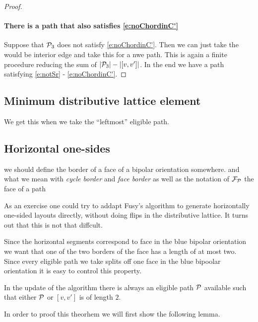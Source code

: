 \begin{proof}

\paragraph{There is a path that also satisfies \ref{e:noChordinC'}}
Suppose that $\P_3$ does not satisfy \ref{e:noChordinC'}. Then we can just take the would be interior edge and take this for a nwe path. This is again a finite procedure reducing the sum of $|\P_3| -|[v,v']|$. In the end we have a path satisfying \ref{e:notSr} - \ref{e:noChordinC'}.



\end{proof}

\subsection{Minimum distributive lattice element}
\label{ss:minimal}
We get this when we take the    ``leftmost'' eligible path. 

\renewcommand{\F}{\scr F}
\subsection{Horizontal one-sides}
\label{ss:blue}
\note we should define the border of a face of a bipolar orientation somewhere. 
\note and what we mean with \emph{cycle border} and \emph{face border}
\note as well as the notation of $\F_\P$ the face of a path

As an exercise one could try to addapt Fusy's algorithm to generate horizontally one-sided layouts directly, without doing flips in the distributive lattice. It turns out that this is not that diffcult.

Since the horizontal segments correspond to face in the blue bipolar orientation we want that one of the two borders of the face has a length of at most two. Since every eligible path we take splits off one face in the blue bipoolar orientation it is easy to control this property.

\begin{thrm}
\label{th:blueelig}
In the update of the algorithm there is always an eligible path $\P$ available such that either $\P$ or $[v,v']$ is of length $2$. 
\end{thrm}

In order to proof this theorhem we will first show the following lemma.

